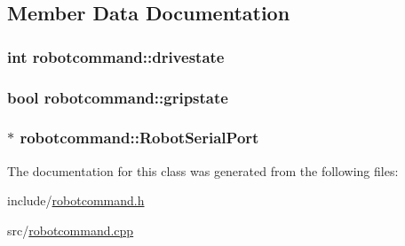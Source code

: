 \subsection{Member Data Documentation}
\hypertarget{classrobotcommand_a4d67204c88b917ad8e395abb5f1384c7}{
\subsubsection[{drivestate}]{\setlength{\rightskip}{0pt plus 5cm}int robotcommand\-::drivestate\hspace{0.3cm}{\ttfamily [private]}}}\label{classrobotcommand_a4d67204c88b917ad8e395abb5f1384c7}
\hypertarget{classrobotcommand_af5bfa13fcb7d45b8812e5c1f4a4cdfbb}{
\subsubsection[{gripstate}]{\setlength{\rightskip}{0pt plus 5cm}bool robotcommand\-::gripstate\hspace{0.3cm}{\ttfamily [private]}}}\label{classrobotcommand_af5bfa13fcb7d45b8812e5c1f4a4cdfbb}
\hypertarget{classrobotcommand_ab4775e1be7dcbea9fcb686001e0d58a1}{
\subsubsection[{Robot\-Serial\-Port}]{$\ast$ robotcommand\-::\-Robot\-Serial\-Port\hspace{0.3cm}{\ttfamily [private]}}}\label{classrobotcommand_ab4775e1be7dcbea9fcb686001e0d58a1}


The documentation for this class was generated from the following files\-:\begin{DoxyCompactItemize}
\item 
include/\hyperlink{robotcommand_8h}{robotcommand.\-h}\item 
src/\hyperlink{robotcommand_8cpp}{robotcommand.\-cpp}\end{DoxyCompactItemize}
